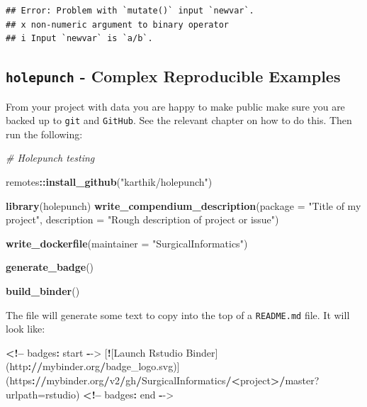 \documentclass[
]{book}
\newenvironment{Shaded}{\begin{snugshade}}{\end{snugshade}}
\newcommand{\CommentTok}[1]{\textcolor[rgb]{0.56,0.35,0.01}{\textit{#1}}}
\newcommand{\DataTypeTok}[1]{\textcolor[rgb]{0.13,0.29,0.53}{#1}}
\newcommand{\ErrorTok}[1]{\textcolor[rgb]{0.64,0.00,0.00}{\textbf{#1}}}
\newcommand{\KeywordTok}[1]{\textcolor[rgb]{0.13,0.29,0.53}{\textbf{#1}}}
\newcommand{\NormalTok}[1]{#1}
\newcommand{\OperatorTok}[1]{\textcolor[rgb]{0.81,0.36,0.00}{\textbf{#1}}}
\newcommand{\StringTok}[1]{\textcolor[rgb]{0.31,0.60,0.02}{#1}}
\begin{document}
\begin{verbatim}
## Error: Problem with `mutate()` input `newvar`.
## x non-numeric argument to binary operator
## i Input `newvar` is `a/b`.
\end{verbatim}

\hypertarget{holepunch---complex-reproducible-examples}{%
\subsection{\texorpdfstring{\texttt{holepunch} - Complex Reproducible Examples}{holepunch - Complex Reproducible Examples}}\label{holepunch---complex-reproducible-examples}}

From your project with data you are happy to make public make sure you are backed up to \texttt{git} and \texttt{GitHub}. See the relevant chapter on how to do this. Then run the following:

\begin{Shaded}
\begin{Highlighting}[]
\CommentTok{# Holepunch testing}

\NormalTok{remotes}\OperatorTok{::}\KeywordTok{install_github}\NormalTok{(}\StringTok{"karthik/holepunch"}\NormalTok{)}

\KeywordTok{library}\NormalTok{(holepunch)}
\KeywordTok{write_compendium_description}\NormalTok{(}\DataTypeTok{package =} \StringTok{"Title of my project"}\NormalTok{, }
                             \DataTypeTok{description =} \StringTok{"Rough description of project or issue"}\NormalTok{)}

\KeywordTok{write_dockerfile}\NormalTok{(}\DataTypeTok{maintainer =} \StringTok{"SurgicalInformatics"}\NormalTok{)}

\KeywordTok{generate_badge}\NormalTok{()}

\KeywordTok{build_binder}\NormalTok{()}
\end{Highlighting}
\end{Shaded}

The file will generate some text to copy into the top of a \texttt{README.md} file. It will look like:

\begin{Shaded}
\begin{Highlighting}[]
\OperatorTok{<!--}\StringTok{ }\NormalTok{badges}\OperatorTok{:}\StringTok{ }\NormalTok{start }\OperatorTok{-}\NormalTok{->}
\NormalTok{[}\OperatorTok{!}\NormalTok{[Launch Rstudio Binder](http}\OperatorTok{:}\ErrorTok{//}\NormalTok{mybinder.org}\OperatorTok{/}\NormalTok{badge_logo.svg)](https}\OperatorTok{:}\ErrorTok{//}\NormalTok{mybinder.org}\OperatorTok{/}\NormalTok{v2}\OperatorTok{/}\NormalTok{gh}\OperatorTok{/}\NormalTok{SurgicalInformatics}\OperatorTok{/}\ErrorTok{<}\NormalTok{project}\OperatorTok{>}\ErrorTok{/}\NormalTok{master?}\DataTypeTok{urlpath=}\NormalTok{rstudio)}
\OperatorTok{<!--}\StringTok{ }\NormalTok{badges}\OperatorTok{:}\StringTok{ }\NormalTok{end }\OperatorTok{-}\NormalTok{->}
\end{Highlighting}
\end{Shaded}
\end{document}
